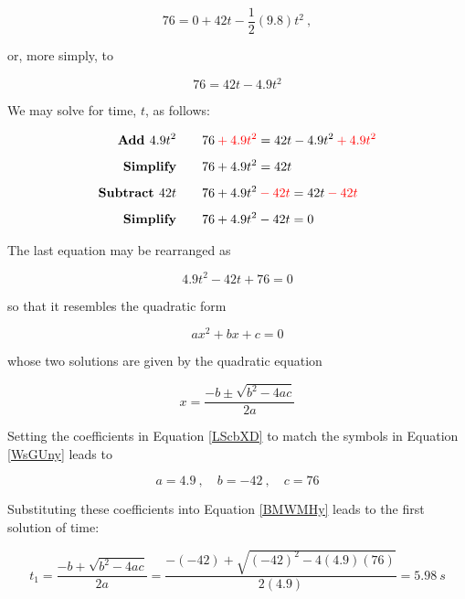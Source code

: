 \documentclass[main-physics.tex]{subfiles}
\begin{document}
\begin{equation*}
    76 =  0 + 42 t -\frac{1}{2}(9.8) t^2\ ,
\end{equation*}

or, more simply, to

\begin{equation*}
    76 = 42 t - 4.9 t^2
\end{equation*}

We may solve for time, $t$, as follows:

\begin{align*}
    \textbf{Add $4.9 t^2$} \qquad & 76 \mathbin{\color{red} +} \textcolor{red}{4.9 t^2} = 42 t - 4.9 t^2 \mathbin{\color{red} +} \textcolor{red}{4.9 t^2}\\[1ex]
    \textbf{Simplify} \qquad & 76 + 4.9 t^2 = 42 t\\[1ex]
    \textbf{Subtract $42 t$} \qquad & 76 + 4.9 t^2 \mathbin{\color{red} -} \textcolor{red}{42 t} = 42 t \mathbin{\color{red} -} \textcolor{red}{42 t}\\[1ex]
    \textbf{Simplify} \qquad & 76 + 4.9 t^2 - 42 t = 0
\end{align*}

The last equation may be rearranged as 

\begin{equation} \label{LScbXD}
    4.9 t^2 - 42 t + 76 = 0
\end{equation}

so that it resembles the quadratic form

\begin{equation} \label{WsGUny}
    ax^2 + bx + c = 0
\end{equation}

whose two solutions are given by the quadratic equation

\begin{equation} \label{BMWMHy}
    x = \frac{-b \pm \sqrt{b^2 - 4ac}}{2a}
\end{equation}

Setting the coefficients in Equation \eqref{LScbXD} to match the symbols in Equation \eqref{WsGUny} leads to 

\begin{equation*}
    a = 4.9\ , \quad b = -42\ ,\quad c = 76
\end{equation*}

Substituting these coefficients into Equation \eqref{BMWMHy} leads to the first solution of time:

\begin{equation*}
    t_1 = \frac{-b + \sqrt{b^2 - 4ac}}{2a} = \frac{-(-42) + \sqrt{(-42)^2 - 4 (4.9)(76)}}{2(4.9)} = \SI{5.98}{s}
\end{equation*}
\end{document}

